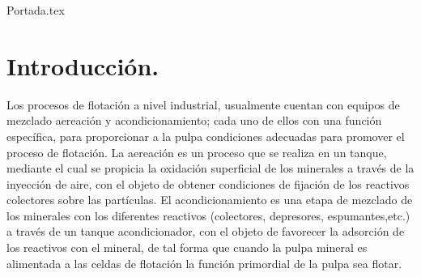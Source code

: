 \documentclass[11pt,letter
								]
								{article}
\begin{document}
 {Portada.tex}




\section{Introducción.}	
	




Los procesos de flotación a nivel industrial, usualmente cuentan con equipos de mezclado aereación y acondicionamiento; cada uno de ellos con una función específica, para proporcionar a la pulpa condiciones adecuadas para promover el proceso de  flotación. La aereación es un proceso que se realiza en un tanque, mediante el cual se propicia la oxidación superficial de los minerales a través de la inyección de aire, con el objeto de obtener condiciones de fijación de los reactivos colectores sobre las partículas. El acondicionamiento es una etapa de mezclado de los minerales con los diferentes reactivos (colectores, depresores, espumantes,etc.) a través de un tanque acondicionador, con el objeto de favorecer la adsorción de los reactivos con el mineral, de tal forma que cuando la pulpa mineral es alimentada a las celdas de flotación la función primordial de la pulpa sea flotar.\\ 
\end{document}
